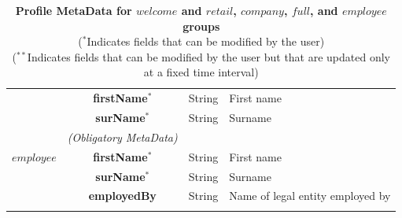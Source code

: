 \begin{table}[H]
\begin{centering}
{\begin{tabular}{ r | c | l | l }
\cline{2-2}
			& {\bf firstName}$^*$			&String	& First name \\
			& {\bf surName}$^*$			&String	& Surname \\
\Xhline{1.5pt}
			& \emph{(Obligatory MetaData)} & & \\
\cline{2-2}
$employee$	& {\bf firstName}$^*$			&String	& First name \\
			& {\bf surName}$^*$			&String	& Surname \\
			& {\bf employedBy}			&String	& Name of legal entity employed by \\
\Xhline{1.5pt}
\end{tabular}
}
\caption{\small\textbf{Profile MetaData for $welcome$ and $retail$, $company$, $full$, and $employee$ groups}\\
($^*$Indicates fields that can be modified by the user)\\
($^{**}$Indicates fields that can be modified by the user but that are updated only at a fixed time interval)}
\label{tab:ProfileMetaData1}
\end{centering}
\end{table}


